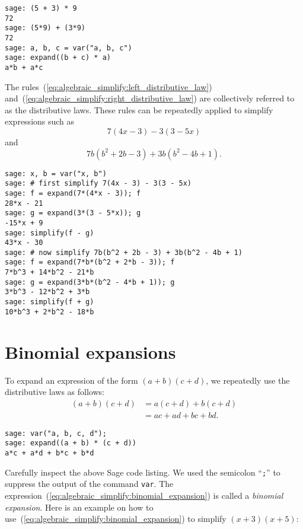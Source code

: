 \begin{lstlisting}
sage: (5 + 3) * 9
72
sage: (5*9) + (3*9)
72
sage: a, b, c = var("a, b, c")
sage: expand((b + c) * a)
a*b + a*c
\end{lstlisting}

The rules~(\ref{eq:algebraic_simplify:left_distributive_law})
and~(\ref{eq:algebraic_simplify:right_distributive_law}) are
collectively referred to as the distributive laws.
These rules can be repeatedly applied to simplify expressions such as
\[
7(4x - 3) - 3(3 - 5x)
\]
and
\[
7b(b^2 + 2b - 3) + 3b(b^2 - 4b + 1).
\]

\begin{lstlisting}
sage: x, b = var("x, b")
sage: # first simplify 7(4x - 3) - 3(3 - 5x)
sage: f = expand(7*(4*x - 3)); f
28*x - 21
sage: g = expand(3*(3 - 5*x)); g
-15*x + 9
sage: simplify(f - g)
43*x - 30
sage: # now simplify 7b(b^2 + 2b - 3) + 3b(b^2 - 4b + 1)
sage: f = expand(7*b*(b^2 + 2*b - 3)); f
7*b^3 + 14*b^2 - 21*b
sage: g = expand(3*b*(b^2 - 4*b + 1)); g
3*b^3 - 12*b^2 + 3*b
sage: simplify(f + g)
10*b^3 + 2*b^2 - 18*b
\end{lstlisting}



\section{Binomial expansions}

To expand an expression of the form $(a + b)(c + d)$, we repeatedly
use the distributive laws as follows:
%
\begin{equation}
\label{eq:algebraic_simplify:binomial_expansion}
\begin{aligned}
(a + b)(c + d)
&= a(c + d) + b(c + d) \\
&= ac + ad + bc + bd.
\end{aligned}
\end{equation}

\begin{lstlisting}
sage: var("a, b, c, d");
sage: expand((a + b) * (c + d))
a*c + a*d + b*c + b*d
\end{lstlisting}

Carefully inspect the above Sage code listing. We used the semicolon
``\texttt{;}'' to suppress the output of the command \texttt{var}. The
expression~(\ref{eq:algebraic_simplify:binomial_expansion}) is called
a \emph{binomial expansion}. Here is an
example on how to
use~(\ref{eq:algebraic_simplify:binomial_expansion}) to simplify
$(x + 3)(x + 5)$:

